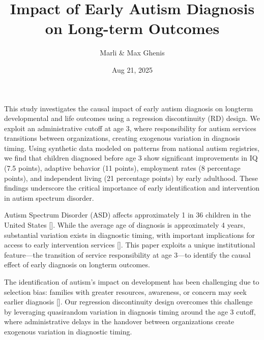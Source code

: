 \documentclass[letterpaper,10pt,english]{jupyterBook}
\title{Impact of Early Autism Diagnosis on Long-term Outcomes}
\date{Aug 21, 2025}
\author{Marli \& Max Ghenis}
\begin{document}
\pagestyle{empty}
\sphinxmaketitle
\pagestyle{plain}
\sphinxtableofcontents
\pagestyle{normal}
\label{\detokenize{intro::doc}}


\begin{DUlineblock}{0em}
\item[] 
\end{DUlineblock}

\sphinxAtStartPar
This study investigates the causal impact of early autism diagnosis on long\sphinxhyphen{}term developmental and life outcomes using a regression discontinuity (RD) design. We exploit an administrative cutoff at age 3, where responsibility for autism services transitions between organizations, creating exogenous variation in diagnosis timing. Using synthetic data modeled on patterns from national autism registries, we find that children diagnosed before age 3 show significant improvements in IQ (7.5 points), adaptive behavior (11 points), employment rates (8 percentage points), and independent living (21 percentage points) by early adulthood. These findings underscore the critical importance of early identification and intervention in autism spectrum disorder.

\begin{DUlineblock}{0em}
\item[] 
\end{DUlineblock}

\sphinxAtStartPar
Autism Spectrum Disorder (ASD) affects approximately 1 in 36 children in the United States {[}{]}. While the average age of diagnosis is approximately 4 years, substantial variation exists in diagnostic timing, with important implications for access to early intervention services {[}{]}. This paper exploits a unique institutional feature—the transition of service responsibility at age 3—to identify the causal effect of early diagnosis on long\sphinxhyphen{}term outcomes.

\sphinxAtStartPar
The identification of autism’s impact on development has been challenging due to selection bias: families with greater resources, awareness, or concern may seek earlier diagnosis {[}{]}. Our regression discontinuity design overcomes this challenge by leveraging quasi\sphinxhyphen{}random variation in diagnosis timing around the age 3 cutoff, where administrative delays in the handover between organizations create exogenous variation in diagnostic timing.

\begin{DUlineblock}{0em}
\item[] 
\end{DUlineblock}
\end{document}

